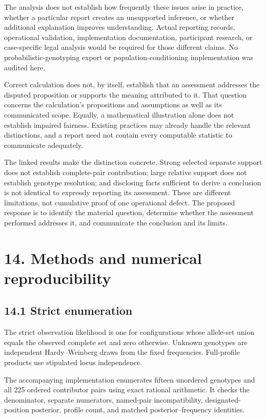 \documentclass[
]{article}
\begin{document}
The analysis does not establish how frequently these issues arise in
practice, whether a particular report creates an unsupported inference,
or whether additional explanation improves understanding. Actual
reporting records, operational validation, implementation documentation,
participant research, or case-specific legal analysis would be required
for those different claims. No probabilistic-genotyping export or
population-conditioning implementation was audited here.

Correct calculation does not, by itself, establish that an assessment
addresses the disputed proposition or supports the meaning attributed to
it. That question concerns the calculation's propositions and
assumptions as well as its communicated scope. Equally, a mathematical
illustration alone does not establish impaired fairness. Existing
practices may already handle the relevant distinctions, and a report
need not contain every computable statistic to communicate adequately.

The linked results make the distinction concrete. Strong selected
separate support does not establish complete-pair contribution; large
relative support does not establish genotype resolution; and disclosing
facts sufficient to derive a conclusion is not identical to expressly
reporting its assessment. These are different limitations, not
cumulative proof of one operational defect. The proposed response is to
identify the material question, determine whether the assessment
performed addresses it, and communicate the conclusion and its limits.

\section{14. Methods and numerical
reproducibility}\label{methods-and-numerical-reproducibility}

\subsection{14.1 Strict enumeration}\label{strict-enumeration}

The strict observation likelihood is one for configurations whose
allele-set union equals the observed complete set and zero otherwise.
Unknown genotypes are independent Hardy--Weinberg draws from the fixed
frequencies. Full-profile products use stipulated locus independence.

The accompanying implementation enumerates fifteen unordered genotypes
and all 225 ordered contributor pairs using exact rational arithmetic.
It checks the denominator, separate numerators, named-pair
incompatibility, designated-position posterior, profile count, and
matched posterior--frequency identities.
\end{document}
